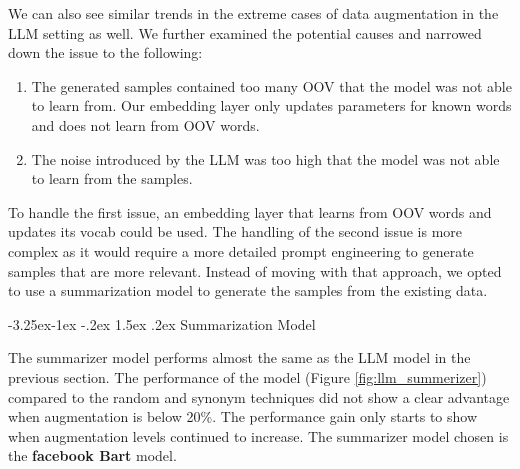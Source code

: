 \documentclass{article}
\makeatletter
\renewcommand\paragraph{\@startsection{paragraph}{4}{\z@}%
                                     {-3.25ex\@plus -1ex \@minus -.2ex}%
                                     {1.5ex \@plus .2ex}%
                                     {\normalfont\normalsize\bfseries}}
\makeatother
\begin{document}
We can also see similar trends in the extreme cases of data augmentation in the
LLM setting as well. We further examined the potential causes and narrowed down
the issue to the following:

\begin{enumerate}
  \item The generated samples contained too many OOV that the model was not able to
        learn from. Our embedding layer only updates parameters for known words and
        does not learn from OOV words.
  \item The noise introduced by the LLM was too high that the model was not able to
        learn from the samples.
\end{enumerate}

To handle the first issue, an embedding layer that learns from OOV words and
updates its vocab could be used. The handling of the second issue is more
complex as it would require a more detailed prompt engineering to generate
samples that are more relevant. Instead of moving with that approach, we opted
to use a summarization model to generate the samples from the existing data.

\paragraph{Summarization Model}

The summarizer model performs almost the same as the LLM model in the previous
section. The performance of the model (Figure \ref{fig:llm_summerizer})
compared to the random and synonym techniques did not show a clear advantage
when augmentation is below 20\%. The performance gain only starts to show when
augmentation levels continued to increase. The summarizer model chosen is the
\textbf{facebook Bart} model.
\end{document}
